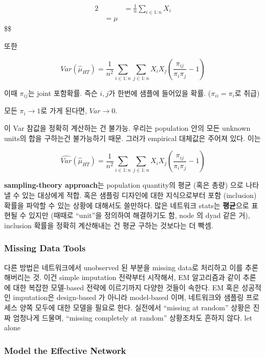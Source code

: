 \documentclass[
]{book}
\begin{document}
{{{\begin{alignat}{2}
&&= \frac{1}{n} \sum_{i \in 1:n} {X_i}

\\

&= \mu

\end{alignat}
\$\$

또한

\[
Var \left ( \hat \mu_{HT} \right )= \frac{1}{n^2} \sum_{i \in 1:n} \sum_{j \in 1:n} X_i X_j \left( \frac{\pi_{ij}}{\pi_i \pi_j} -1 \right)
\]

이때 \(\pi_{ij}\)는 joint 포함확률. 즉슨 \(i,j\)가 한번에 샘플에 들어있을 확률. (\(\pi_{ii} = \pi_i\)로 취급)

모든 \(\pi_i \rightarrow 1\)로 가게 된다면, \(Var \rightarrow 0\).

이 Var 참값을 정확히 계산하는 건 불가능. 우리는 population 안의 모든 unknown units의 합을 구하는건 불가능하기 때문. 그러가 empirical 대체값은 주어져 있다. 이는

\[
\hat {Var} \left ( \hat \mu_{HT} \right) = \frac{1}{n^2} \sum_{i \in 1:n} \sum_{j \in 1:n} X_i X_j \left( \frac{\pi_{ij}}{\pi_i \pi_j} -1 \right)
\]

\textbf{sampling-theory approach}는 population quantity의 평균 (혹은 총량) 으로 나타낼 수 있는 대상에게 적합. 혹은 샘플링 디자인에 대한 지식으로부터 포함 (inclusion) 확률을 파악할 수 있는 상황에 대해서도 쓸만하다. 많은 네트워크 stats는 \textbf{평균}으로 표현될 수 있지만 (때때로 ``unit''을 정의하여 해결하기도 함, node 의 dyad 같은 거), inclusion 확률을 정확히 계산해내는 건 평균 구하는 것보다는 더 빡셈.

\hypertarget{missing-data-tools}{%
\subsubsection{Missing Data Tools}\label{missing-data-tools}}

다른 방법은 네트워크에서 unobserved 된 부분을 missing data로 처리하고 이를 추론해버리는 것. 이건 simple imputation 전략부터 시작해서, EM 알고리즘과 같이 추론에 대한 복잡한 모델-based 전략에 이르기까지 다양한 것들이 속한다. EM 혹은 성공적인 imputation은 design-based 가 아니라 model-based 이며, 네트워크와 샘플링 프로세스 양쪽 모두에 대한 모델을 필요로 한다. 실전에서 ``missing at random'' 상황은 진짜 엄청나게 드물며, ``missing completely at random'' 상황조차도 흔하지 않다. let alone

\hypertarget{model-the-effective-network}{%
\subsubsection{Model the Effective Network}\label{model-the-effective-network}}

}}}
\end{document}
